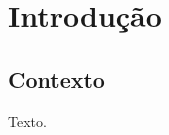 \documentclass{KomaTCC}
\begin{document}
\chapter{Introdução}
\lipsum[1]

\section{Contexto}
Texto.
\end{document}
